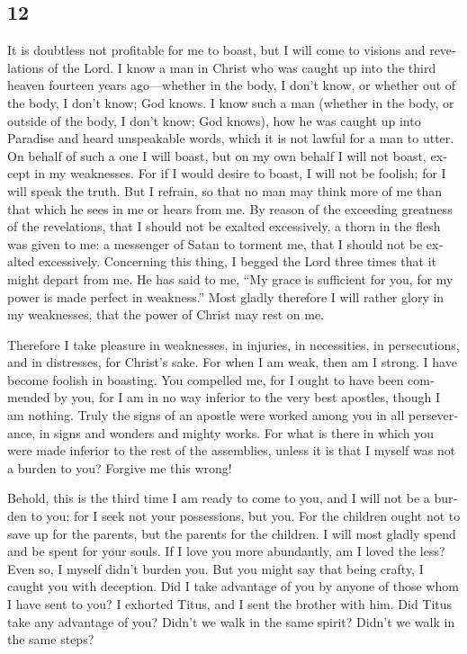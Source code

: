 \begin{paracol}{2}
\switchcolumn
\begin{otherlanguage}{english}

\hypertarget{section-23}{%
\section{12}\label{section-23}}

 It is doubtless not profitable for me to boast, but I
will come to visions and revelations of the Lord.  I know
a man in Christ who was caught up into the third heaven fourteen years
ago---whether in the body, I don't know, or whether out of the body, I
don't know; God knows.  I know such a man (whether in the
body, or outside of the body, I don't know; God knows), 
how he was caught up into Paradise and heard unspeakable words, which it
is not lawful for a man to utter.  On behalf of such a one
I will boast, but on my own behalf I will not boast, except in my
weaknesses.  For if I would desire to boast, I will not be
foolish; for I will speak the truth. But I refrain, so that no man may
think more of me than that which he sees in me or hears from me.
 By reason of the exceeding greatness of the revelations,
that I should not be exalted excessively, a thorn in the flesh was given
to me: a messenger of Satan to torment me, that I should not be exalted
excessively.  Concerning this thing, I begged the Lord
three times that it might depart from me.  He has said to
me, ``My grace is sufficient for you, for my power is made perfect in
weakness.'' Most gladly therefore I will rather glory in my weaknesses,
that the power of Christ may rest on me.

 Therefore I take pleasure in weaknesses, in injuries, in
necessities, in persecutions, and in distresses, for Christ's sake. For
when I am weak, then am I strong.  I have become foolish
in boasting. You compelled me, for I ought to have been commended by
you, for I am in no way inferior to the very best apostles, though I am
nothing.  Truly the signs of an apostle were worked among
you in all perseverance, in signs and wonders and mighty works.
 For what is there in which you were made inferior to the
rest of the assemblies, unless it is that I myself was not a burden to
you? Forgive me this wrong!

 Behold, this is the third time I am ready to come to
you, and I will not be a burden to you; for I seek not your possessions,
but you. For the children ought not to save up for the parents, but the
parents for the children.  I will most gladly spend and
be spent for your souls. If I love you more abundantly, am I loved the
less?  Even so, I myself didn't burden you. But you might
say that being crafty, I caught you with deception.  Did
I take advantage of you by anyone of those whom I have sent to you?
 I exhorted Titus, and I sent the brother with him. Did
Titus take any advantage of you? Didn't we walk in the same spirit?
Didn't we walk in the same steps?


\end{otherlanguage}
\end{paracol}
